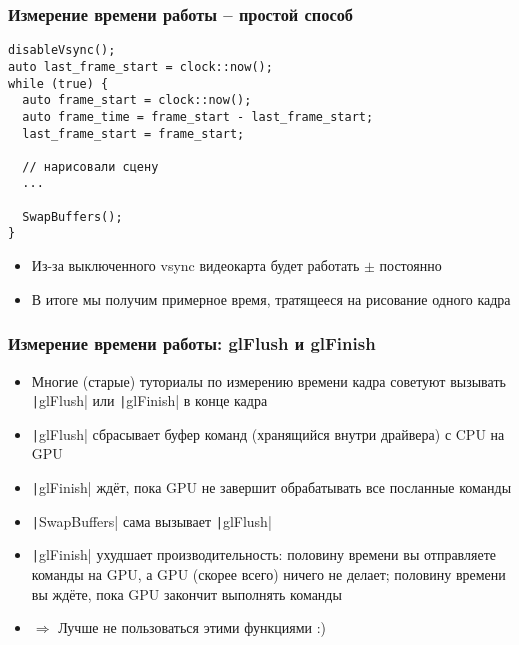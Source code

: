 \documentclass{beamer}
\begin{document}
\begin{frame}[fragile]
\frametitle{Измерение времени работы -- простой способ}
\begin{verbatim}
disableVsync();
auto last_frame_start = clock::now();
while (true) {
  auto frame_start = clock::now();
  auto frame_time = frame_start - last_frame_start;
  last_frame_start = frame_start;

  // нарисовали сцену
  ...

  SwapBuffers();
}
\end{verbatim}
\vspace*{-1cm}
\pause
\begin{itemize}
\item Из-за выключенного vsync видеокарта будет работать \begin{math}\pm\end{math} постоянно
\pause
\item В итоге мы получим примерное время, тратящееся на рисование одного кадра
\end{itemize}
\end{frame}

\begin{frame}[fragile]
\frametitle{Измерение времени работы: glFlush и glFinish}
\begin{itemize}
\item Многие (старые) туториалы по измерению времени кадра советуют вызывать \texttt|glFlush| или \texttt|glFinish| в конце кадра
\pause
\item \texttt|glFlush| сбрасывает буфер команд (хранящийся внутри драйвера) с CPU на GPU
\pause
\item \texttt|glFinish| ждёт, пока GPU не завершит обрабатывать все посланные команды
\pause
\item \texttt|SwapBuffers| сама вызывает \texttt|glFlush|
\pause
\item \texttt|glFinish| ухудшает производительность: половину времени вы отправляете команды на GPU, а GPU (скорее всего) ничего не делает; половину времени вы ждёте, пока GPU закончит выполнять команды
\pause
\item \begin{math}\Longrightarrow\end{math} Лучше не пользоваться этими функциями :)
\end{itemize}
\end{frame}
\end{document}
